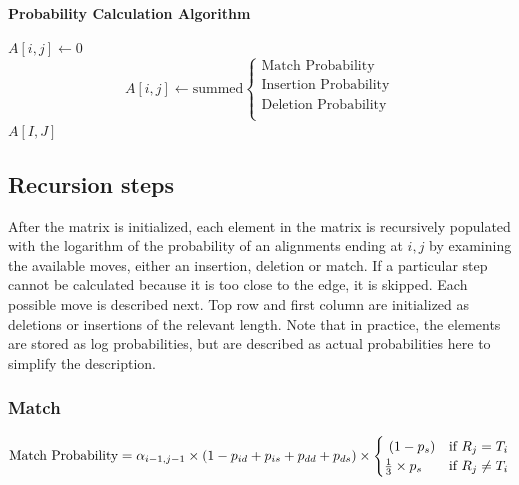 \documentclass[fleqn,10pt]{SelfArx} %
\begin{document}
\begin{algorithm}
\caption*{\textbf{Probability Calculation Algorithm}}
\label{calcScore}
\begin{algorithmic}[h]
\STATE $A[i,j] \leftarrow 0$
\ELSE
\STATE \[
	A[i,j]  \leftarrow \text{summed}
\begin{cases}
	\text{Match Probability} \\
	\text{Insertion Probability} \\
	\text{Deletion Probability} \\
   	\end{cases}
\]
\ENDIF	
\ENDFOR
\ENDFOR
\RETURN $A[I,J]$
\end{algorithmic}
\end{algorithm}





\subsection{Recursion steps}
After the matrix is initialized, each element in the matrix is recursively populated with the logarithm of the probability of an alignments ending at $i,j$ by examining the available moves, either an insertion, deletion or match.  If a particular step cannot be calculated because it is too close to the edge, it is skipped.  Each possible move is described next.  Top row and first column are initialized as deletions or insertions of the relevant length.  Note that in practice, the elements are stored as log probabilities, but are described as actual probabilities here to simplify the description.






\subsubsection{\textbf{Match}}

\begin{dmath}
\text{Match Probability} = \\
	 \alpha_{i-1,j-1}  \times  (1-p_{id}+p_{is}+p_{dd}+p_{ds})  \times 
	 \begin{cases}
							 \ (1-p_{s}) & \text{if }  R_{j} = T_{i} \\
							 \frac{1}{3} \times p_{s}  & \text{if }  R_{j}  \neq T_{i} 
							 \end{cases}
\end{dmath}
\end{document}
